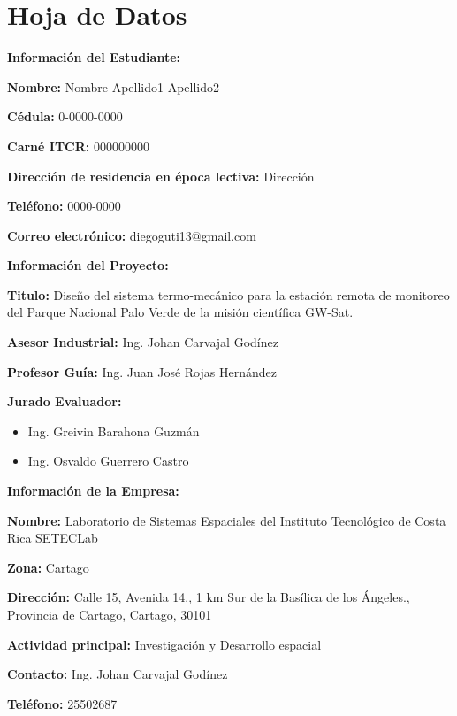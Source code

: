 \thispagestyle{plain}
\chapter*{Hoja de Datos}

\Large
\textbf{Información del Estudiante:}

\normalsize

\textbf{Nombre:} Nombre Apellido1 Apellido2

\textbf{Cédula:} 0-0000-0000

\textbf{Carné ITCR:} 000000000

\textbf{Dirección de residencia en época lectiva:} Dirección

\textbf{Teléfono:} 0000-0000

\textbf{Correo electrónico:} diegoguti13$@$gmail.com

\vspace{1cm}

\Large
\textbf{Información del Proyecto:}
\normalsize

\textbf{Titulo:} Diseño del sistema termo-mecánico para la estación remota de monitoreo del Parque Nacional \indent Palo Verde de la misión científica GW-Sat.

\textbf{Asesor Industrial:} Ing. Johan Carvajal Godínez

\textbf{Profesor Guía:} Ing. Juan José Rojas Hernández

\textbf{Jurado Evaluador:}
\begin{itemize}
    \item Ing. Greivin Barahona Guzmán
    \item Ing. Osvaldo Guerrero Castro
\end{itemize}


\vspace{1cm}
\Large
\textbf{Información de la Empresa:}
\normalsize

\textbf{Nombre:} Laboratorio de Sistemas Espaciales del Instituto Tecnológico de Costa Rica SETECLab

\textbf{Zona:} Cartago

\textbf{Dirección:} Calle 15, Avenida 14., 1 km Sur de la Basílica de los Ángeles., Provincia de Cartago, \indent Cartago, 30101

\textbf{Actividad principal:} Investigación y Desarrollo espacial

\textbf{Contacto:} Ing. Johan Carvajal Godínez

\textbf{Teléfono:} 25502687 


